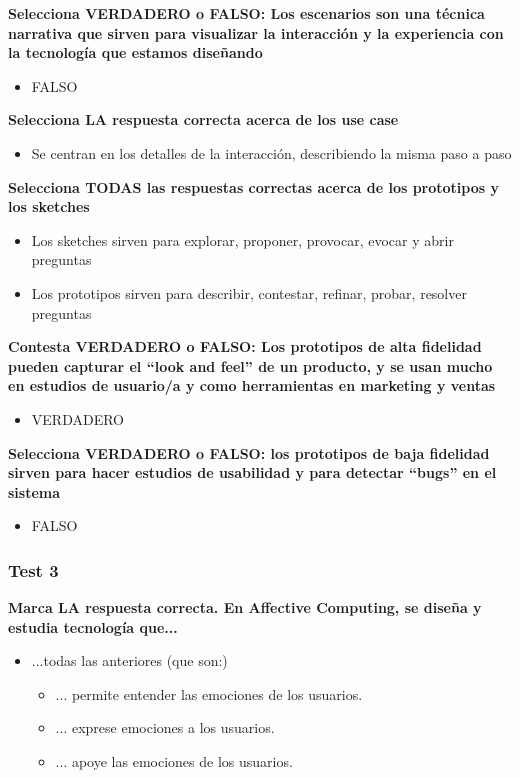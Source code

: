 \documentclass[12pt, twoside, openright]{report} %
\begin{document}
\textbf{Selecciona VERDADERO o FALSO: Los escenarios son una técnica narrativa que sirven para visualizar la interacción y la experiencia con la tecnología que estamos diseñando}
\begin{itemize}
	\item FALSO
\end{itemize}

\textbf{Selecciona LA respuesta correcta acerca de los use case}
\begin{itemize}
	\item Se centran en los detalles de la interacción, describiendo la misma paso a paso
\end{itemize}

\textbf{Selecciona TODAS las respuestas correctas acerca de los prototipos y los sketches}
\begin{itemize}
	\item Los sketches sirven para explorar, proponer, provocar, evocar y abrir preguntas
	\item Los prototipos sirven para describir, contestar, refinar, probar, resolver preguntas
\end{itemize}

\textbf{Contesta VERDADERO o FALSO: Los prototipos de alta fidelidad pueden capturar el \enquote{look and feel} de un producto, y se usan mucho en estudios de usuario/a y como herramientas en marketing y ventas}
\begin{itemize}
	\item VERDADERO
\end{itemize}

\textbf{Selecciona VERDADERO o FALSO: los prototipos de baja fidelidad sirven para hacer estudios de usabilidad y para detectar \enquote{bugs}  en el sistema}
\begin{itemize}
	\item FALSO
\end{itemize}
\pagebreak
\subsubsection{Test 3}

\textbf{Marca LA respuesta correcta. En Affective Computing, se diseña y estudia tecnología que...}
\begin{itemize}
	\item ...todas las anteriores (que son:)
	      \begin{itemize}
		      \item ... permite entender las emociones de los usuarios.
		      \item ... exprese emociones a los usuarios.
		      \item ... apoye las emociones de los usuarios.
	      \end{itemize}
\end{itemize}
\end{document}
